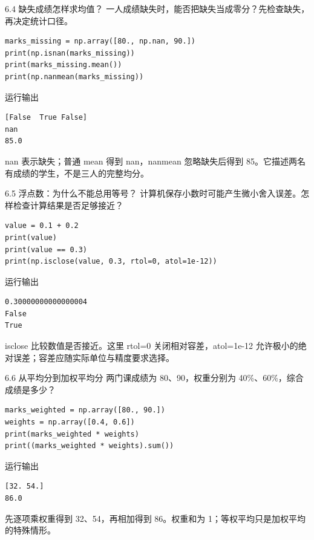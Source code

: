 \documentclass[9pt]{ctexbeamer}
\begin{document}
\begin{frame}[fragile]{6.4 缺失成绩怎样求均值？}
\small 一人成绩缺失时，能否把缺失当成零分？先检查缺失，再决定统计口径。
\medskip
\begin{lstlisting}
marks_missing = np.array([80., np.nan, 90.])
print(np.isnan(marks_missing))
print(marks_missing.mean())
print(np.nanmean(marks_missing))
\end{lstlisting}
\begin{exampleblock}{运行输出}
\begin{lstlisting}
[False  True False]
nan
85.0
\end{lstlisting}
\end{exampleblock}
\small nan 表示缺失；普通 mean 得到 nan，nanmean 忽略缺失后得到 85。它描述两名有成绩的学生，不是三人的完整均分。
\end{frame}

\begin{frame}[fragile]{6.5 浮点数：为什么不能总用等号？}
\small 计算机保存小数时可能产生微小舍入误差。怎样检查计算结果是否足够接近？
\medskip
\begin{lstlisting}
value = 0.1 + 0.2
print(value)
print(value == 0.3)
print(np.isclose(value, 0.3, rtol=0, atol=1e-12))
\end{lstlisting}
\begin{exampleblock}{运行输出}
\begin{lstlisting}
0.30000000000000004
False
True
\end{lstlisting}
\end{exampleblock}
\small isclose 比较数值是否接近。这里 rtol=0 关闭相对容差，atol=1e-12 允许极小的绝对误差；容差应随实际单位与精度要求选择。
\end{frame}

\begin{frame}[fragile]{6.6 从平均分到加权平均分}
\small 两门课成绩为 80、90，权重分别为 40\%、60\%，综合成绩是多少？
\medskip
\begin{lstlisting}
marks_weighted = np.array([80., 90.])
weights = np.array([0.4, 0.6])
print(marks_weighted * weights)
print((marks_weighted * weights).sum())
\end{lstlisting}
\begin{exampleblock}{运行输出}
\begin{lstlisting}
[32. 54.]
86.0
\end{lstlisting}
\end{exampleblock}
\small 先逐项乘权重得到 32、54，再相加得到 86。权重和为 1；等权平均只是加权平均的特殊情形。
\end{frame}
\end{document}
